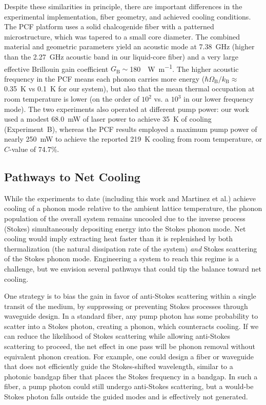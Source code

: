 Despite these similarities in principle, there are important differences in the experimental implementation, fiber geometry, and achieved cooling conditions. The \ac{PCF} platform uses a solid chalcogenide fiber with a patterned microstructure, which was tapered to a small core diameter. The combined material and geometric parameters yield an acoustic mode at \SI{7.38}{\giga\hertz} (higher than the \SI{2.27}{\giga\hertz} acoustic band in our liquid-core fiber) and a very large effective Brillouin gain coefficient \(G_{\mathrm{B}} \sim\)\SI{180}{\per\watt\per\meter}. The higher acoustic frequency in the \ac{PCF} means each phonon carries more energy (\(\hbar\Omega_{\mathrm{B}}/k_{\mathrm{B}} \approx\) \SI{0.35}{\kelvin} vs \SI{0.1}{\kelvin} for our system), but also that the mean thermal occupation at room temperature is lower (on the order of \(10^{2}\) vs. a \(10^{3}\) in our lower frequency mode). The two experiments also operated at different pump power: our work used a modest \SI{68.0}{\milli\watt} of laser power to achieve \SI{35}{\kelvin} of cooling (Experiment~B), whereas the \ac{PCF} results employed a maximum pump power of nearly \SI{250}{\milli\watt} to achieve the reported \SI{219}{\kelvin} cooling from room temperature, or \(C\)-value of 74.7\%. \cite{blazquez2024optoacoustic}

\subsection{Pathways to Net Cooling}
\label{Cooling:subsec:PathwaystoNetCooling}

While the experiments to date (including this work and Martinez et al.) achieve cooling of a phonon mode relative to the ambient lattice temperature, the phonon population of the overall system remains uncooled due to the inverse process (Stokes) simultaneously depositing energy into the Stokes phonon mode. Net cooling would imply extracting heat faster than it is replenished by both thermalization (the natural dissipation rate of the system) \emph{and} Stokes scattering of the Stokes phonon mode. Engineering a system to reach this regime is a challenge, but we envision several pathways that could tip the balance toward net cooling.

One strategy is to bias the gain in favor of anti-Stokes scattering within a single transit of the medium, by suppressing or preventing Stokes processes through waveguide design. In a standard fiber, any pump photon has some probability to scatter into a Stokes photon, creating a phonon, which counteracts cooling. If we can reduce the likelihood of Stokes scattering while allowing anti-Stokes scattering to proceed, the net effect in one pass will be phonon removal without equivalent phonon creation. For example, one could design a fiber or waveguide that does not efficiently guide the Stokes-shifted wavelength, similar to a photonic bandgap fiber that places the Stokes frequency in a bandgap. In such a fiber, a pump photon could still undergo anti-Stokes scattering, but a would-be Stokes photon falls outside the guided modes and is effectively not generated.

